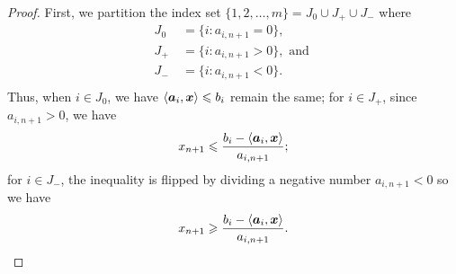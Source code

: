 \begin{proof}
First, we partition the index set $\{1,2,\dots, m\} = J_0\cup J_+\cup J_-$ where 
\begin{equation*}\begin{split}
J_0\ & = \{i: a_{i, n+1} = 0\},  \\
J_+\ & = \{i: a_{i, n+1} > 0\},\text{ and }\\
J_-\ & = \{i: a_{i, n+1} < 0\}.  \\
\end{split}\end{equation*}
Thus, when $i\in J_0$, we have $  \left\langle{\boldsymbol a}_i, {\boldsymbol x}\right\rangle \leqslant b_i  $ remain the same; for $i\in J_+$, since $a_{i, n+1}>0$, we have 
\[  x_{n+1} \leqslant \frac{b_i - \left\langle{\boldsymbol a}_i, {\boldsymbol x}\right\rangle}{a_{i, n+1}}; \]
for $i\in J_-$, the inequality is flipped by dividing a negative number $a_{i, n+1}<0$ so we have
\[  x_{n+1} \geqslant \frac{b_i - \left\langle{\boldsymbol a}_i, {\boldsymbol x}\right\rangle}{a_{i, n+1}}. \]




\end{proof}
